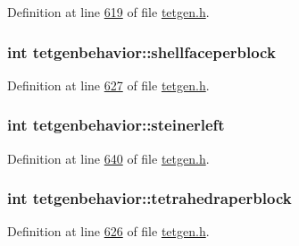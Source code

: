 Definition at line \hyperlink{tetgen_8h_source_l00619}{619} of file \hyperlink{tetgen_8h_source}{tetgen.\+h}.

\subsubsection[{\texorpdfstring{shellfaceperblock}{shellfaceperblock}}]{\setlength{\rightskip}{0pt plus 5cm}int tetgenbehavior\+::shellfaceperblock}\hypertarget{classtetgenbehavior_ade48168b9a70a4aacf9ef7ed52e967fe}{}\label{classtetgenbehavior_ade48168b9a70a4aacf9ef7ed52e967fe}


Definition at line \hyperlink{tetgen_8h_source_l00627}{627} of file \hyperlink{tetgen_8h_source}{tetgen.\+h}.

\subsubsection[{\texorpdfstring{steinerleft}{steinerleft}}]{\setlength{\rightskip}{0pt plus 5cm}int tetgenbehavior\+::steinerleft}\hypertarget{classtetgenbehavior_af6347b10c32052915e93e693d5cd687a}{}\label{classtetgenbehavior_af6347b10c32052915e93e693d5cd687a}


Definition at line \hyperlink{tetgen_8h_source_l00640}{640} of file \hyperlink{tetgen_8h_source}{tetgen.\+h}.

\subsubsection[{\texorpdfstring{tetrahedraperblock}{tetrahedraperblock}}]{\setlength{\rightskip}{0pt plus 5cm}int tetgenbehavior\+::tetrahedraperblock}\hypertarget{classtetgenbehavior_a8780a33de02550bb0197026cc4fa4dca}{}\label{classtetgenbehavior_a8780a33de02550bb0197026cc4fa4dca}


Definition at line \hyperlink{tetgen_8h_source_l00626}{626} of file \hyperlink{tetgen_8h_source}{tetgen.\+h}.

